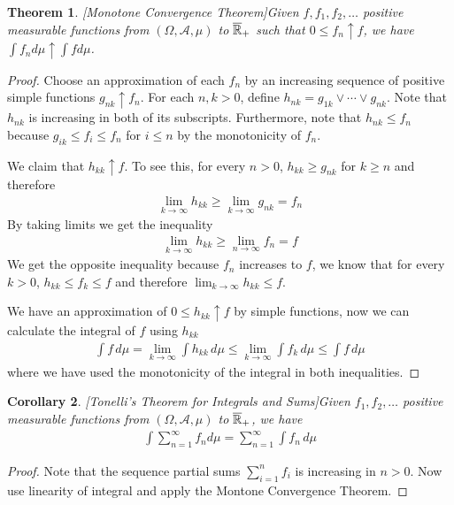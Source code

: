 \documentclass{amsart}
\newtheorem{thm}{Theorem}[section]
\newtheorem{cor}[thm]{Corollary}
\theoremstyle{remark}
\theoremstyle{definition}
\begin{document}
\begin{thm}\label{MCT}[Monotone Convergence Theorem]Given $f, f_1,
  f_2, \dots$ positive measurable functions from
  $(\Omega, \mathcal{A}, \mu)$ to $\overline{\mathbb{R}}_+$ such that $0 \leq f_n \uparrow f$, we
  have $\int f_n d \mu \uparrow \int f d \mu$.
\end{thm}
\begin{proof}Choose an approximation of each $f_n$ by an increasing
  sequence of positive simple functions $g_{nk} \uparrow f_n$.  For
  each $n,k>0$, define $h_{nk} = g_{1k} \vee \cdots \vee g_{nk}$.
  Note that $h_{nk}$ is increasing in both of its subscripts.
  Furthermore, note that $h_{nk} \leq f_n$ because $g_{ik} \leq f_{i}
  \leq f_n$ for $i \leq n$ by the monotonicity of $f_n$.

We  claim that $h_{kk} \uparrow f$.  To see this, for every $n>0$,
  $h_{kk} \geq g_{nk}$ for $k \geq n$ and therefore
\begin{align*}
\lim_{k \to \infty} h_{kk} \geq \lim_{k \to \infty} g_{nk} = f_n
\end{align*}
By taking limits we get the inequality
\begin{align*}
\lim_{k \to \infty} h_{kk} \geq \lim_{n \to \infty} f_n = f
\end{align*}
We get the opposite inequality because $f_n$ increases to $f$, we know that for
every $k>0$, $h_{kk} \leq f_k \leq f$ and therefore $\lim_{k \to
  \infty} h_{kk} \leq f$.

We have an approximation of $0 \leq h_{kk} \uparrow f$ by simple
functions, now we can calculate the integral of $f$ using $h_{kk}$
\begin{align*}
\int f \, d\mu = \lim_{k \to \infty} \int h_{kk} \, d\mu \leq \lim_{k
  \to \infty} \int f_k \, d\mu \leq \int f \, d\mu
\end{align*}
where we have used the monotonicity of the integral in both
inequalities.  
\end{proof}
\begin{cor}\label{TonelliIntegralSum}[Tonelli's Theorem for Integrals
  and Sums]Given $f_1,
  f_2, \dots$ positive measurable functions from
  $(\Omega, \mathcal{A}, \mu)$ to $\overline{\mathbb{R}}_+$, we
  have 
\begin{align*}
\int \sum_{n=1}^\infty f_n d \mu = \sum_{n=1}^\infty \int f_n \, d \mu
\end{align*}
\end{cor}
\begin{proof}Note that the sequence partial sums $\sum_{i=1}^n f_i$ is
  increasing in $n>0$.  Now use linearity of integral and apply the Montone Convergence Theorem.
\end{proof}
\end{document}
